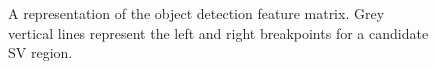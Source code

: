 \begin{figure}
    \centering
    \caption[Sample representations of the object detection feature matrix.]{A representation of the object detection feature matrix. Grey vertical lines represent the left and right breakpoints for a candidate SV region.}
    \label{fig:enter-label}
\end{figure}

